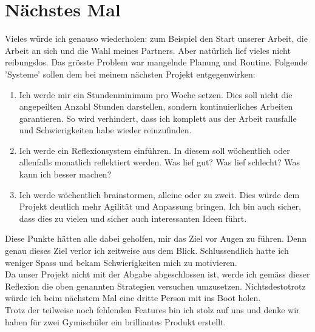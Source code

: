 \section{Nächstes Mal}
Vieles würde ich genauso wiederholen:
zum Beispiel den Start unserer Arbeit, die Arbeit an sich und die Wahl meines Partners.
Aber natürlich lief vieles nicht reibungslos.
Das grösste Problem war mangelnde Planung und Routine.
Folgende 'Systeme' sollen dem bei meinem nächsten Projekt entgegenwirken:
\begin{enumerate}
    \item Ich werde mir ein Stundenminimum pro Woche setzen.
    Dies soll nicht die angepeilten Anzahl Stunden darstellen, sondern kontinuierliches Arbeiten garantieren.
    So wird verhindert, dass ich komplett aus der Arbeit rausfalle und Schwierigkeiten habe wieder reinzufinden.
    \item Ich werde ein Reflexionsystem einführen.
    In diesem soll wöchentlich oder allenfalls monatlich reflektiert werden.
    Was lief gut? Was lief schlecht? Was kann ich besser machen?
    \item Ich werde wöchentlich brainstormen, alleine oder zu zweit. 
    Dies würde dem Projekt deutlich mehr Agilität und Anpassung bringen.
    Ich bin auch sicher, dass dies zu vielen und sicher auch interessanten Ideen führt.
\end{enumerate}
Diese Punkte hätten alle dabei geholfen, mir das Ziel vor Augen zu führen.
Denn genau dieses Ziel verlor ich zeitweise aus dem Blick.
Schlussendlich hatte ich weniger Spass und bekam Schwierigkeiten mich zu motivieren. \\
Da unser Projekt nicht mit der Abgabe abgeschlossen ist, werde ich gemäss dieser Reflexion die oben genannten Strategien versuchen umzusetzen. 
Nichtsdestotrotz würde ich beim nächstem Mal eine dritte Person mit ins Boot holen.\\
Trotz der teilweise noch fehlenden Features bin ich stolz auf uns und denke wir haben für zwei Gymischüler ein brilliantes Produkt erstellt.